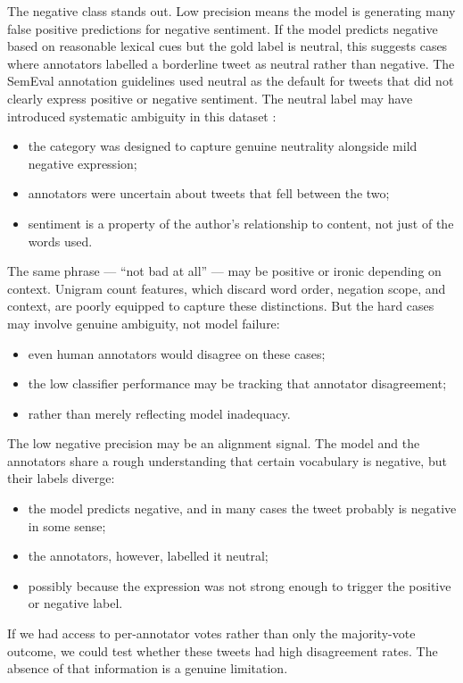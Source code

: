 \documentclass[12pt]{article}
\begin{document}
The negative class stands out. Low precision means the model is generating many false positive predictions for negative sentiment. If the model predicts negative based on reasonable lexical cues but the gold label is neutral, this suggests cases where annotators labelled a borderline tweet as neutral rather than negative. The SemEval annotation guidelines used neutral as the default for tweets that did not clearly express positive or negative sentiment. The neutral label may have introduced systematic ambiguity in this dataset \citep{kenyondean2018sentiment}:
\begin{itemize}
  \item the category was designed to capture genuine neutrality alongside mild negative expression;
  \item annotators were uncertain about tweets that fell between the two;
  \item sentiment is a property of the author's relationship to content, not just of the words used.
\end{itemize}

The same phrase --- ``not bad at all'' --- may be positive or ironic depending on context. Unigram count features, which discard word order, negation scope, and context, are poorly equipped to capture these distinctions. But the hard cases may involve genuine ambiguity, not model failure:
\begin{itemize}
  \item even human annotators would disagree on these cases;
  \item the low classifier performance may be tracking that annotator disagreement;
  \item rather than merely reflecting model inadequacy.
\end{itemize}

The low negative precision may be an alignment signal. The model and the annotators share a rough understanding that certain vocabulary is negative, but their labels diverge:
\begin{itemize}
  \item the model predicts negative, and in many cases the tweet probably is negative in some sense;
  \item the annotators, however, labelled it neutral;
  \item possibly because the expression was not strong enough to trigger the positive or negative label.
\end{itemize} If we had access to per-annotator votes rather than only the majority-vote outcome, we could test whether these tweets had high disagreement rates. The absence of that information is a genuine limitation.
\end{document}
